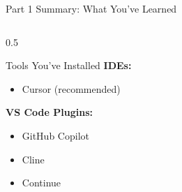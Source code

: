 \documentclass[aspectratio=169,11pt]{beamer}
\begin{document}
\begin{frame}{Part 1 Summary: What You've Learned}
\begin{columns}[T]
\begin{column}{0.5\textwidth}
\begin{exampleblock}{Tools You've Installed}
                \textbf{IDEs:}
                \begin{itemize}
                    \item[$\square$] Cursor (recommended)
                \end{itemize}

                \textbf{VS Code Plugins:}
                \begin{itemize}
                    \item[$\square$] GitHub Copilot
                    \item[$\square$] Cline
                    \item[$\square$] Continue
                \end{itemize}
            \end{exampleblock}
        \end{column}
    \end{columns}

\end{frame}
\end{document}
